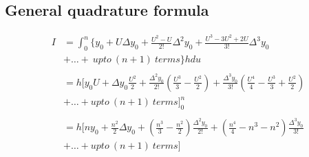 \documentclass[10pt, twoside, a4paper]{article}
\begin{document}
\subsection{General quadrature formula}%
\begin{tcolorbox}
\begin{align*}
  I &= \int_{0}^{n}\{y_0+U\Delta y_0
     +\frac{U^2-U}{2!}\Delta^2y_0+\frac{U^3-3U^2+2U}{3!}\Delta^3y_0\\
    &+ \dots +\ upto\ (n+1)\ terms\} hdu\\
    \ \\
    &= h[y_0U+\Delta y_0\frac{U^2}{2}
     +\frac{\Delta^2y_0}{2!}(\frac{U^3}{3}-\frac{U^2}{2})
     +\frac{\Delta^3y_0}{3!}(\frac{U^4}{4}-\frac{U^3}{3}+\frac{U^2}{2})\\
    &+ \dots+upto\ (n+1)\ terms]_{0}^{n}\\
    \ \\
    &= h[ny_0+\frac{n^2}{2}\Delta y_0
     +(\frac{n^3}{3}-\frac{n^2}{2})\frac{\Delta^2y_0}{2!}
     +(\frac{n^4}{4}-n^3-n^2)\frac{\Delta^3y_0}{3!}\\
    &+ \dots+upto\ (n+1)\ terms]
\end{align*}
  
\end{tcolorbox}
\end{document}
